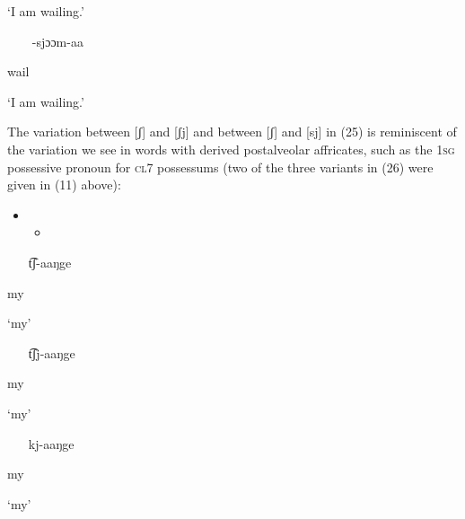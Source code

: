 \documentclass[output=paper]{langsci/langscibook}
\begin{document}
\textsc{‘I }am wailing.’

\begin{itemize}
\item [-sjɔɔm-aa]

\end{itemize}

wail

\textsc{‘I }am wailing.’

The variation between [ʃ] and [ʃj] and between [ʃ] and [sj] in (25) is reminiscent of the variation we see in words with derived postalveolar affricates, such as the 1\textsc{sg} possessive pronoun for \textsc{cl}7 possessums (two of the three variants in (26) were given in (11) above):

\setcounter{itemize}{0}
\begin{itemize}
\item \setcounter{itemize}{0}
\begin{itemize}
\item \end{itemize}
\end{itemize}
\setcounter{itemize}{0}
\begin{itemize}
\item [t͡ʃ-aaŋge]

\end{itemize}

my

‘my’

\begin{itemize}
\item [t͡ʃj-aaŋge]

\end{itemize}

my

‘my’

\begin{itemize}
\item [kj-aaŋge]

\end{itemize}

my

‘my’
\end{document}
